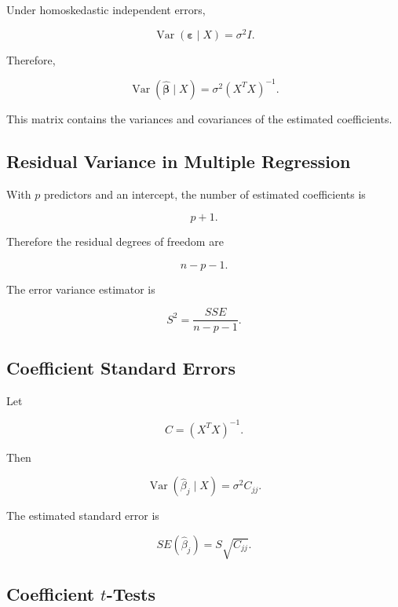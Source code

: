 Under homoskedastic independent errors,

\[
\operatorname{Var}
(
\boldsymbol{\varepsilon}\mid X
)
=
\sigma^2I.
\]

Therefore,

\[
\boxed{
\operatorname{Var}
(
\widehat{\boldsymbol{\beta}}
\mid X
)
=
\sigma^2
(X^TX)^{-1}.
}
\]

This matrix contains the variances and covariances of the estimated
coefficients.

\subsection{Residual Variance in Multiple Regression}
\label{subsec:residual-variance-multiple-regression}

With \(p\) predictors and an intercept, the number of estimated
coefficients is

\[
p+1.
\]

Therefore the residual degrees of freedom are

\[
\boxed{
n-p-1.
}
\]

The error variance estimator is

\[
\boxed{
S^2
=
\frac{
SSE
}{
n-p-1
}.
}
\]

\subsection{Coefficient Standard Errors}
\label{subsec:coefficient-standard-errors}

Let

\[
C
=
(X^TX)^{-1}.
\]

Then

\[
\operatorname{Var}
(
\widehat{\beta}_j
\mid X
)
=
\sigma^2C_{jj}.
\]

The estimated standard error is

\[
\boxed{
SE(\widehat{\beta}_j)
=
S\sqrt{C_{jj}}.
}
\]

\subsection{Coefficient \(t\)-Tests}
\label{subsec:coefficient-t-tests}

